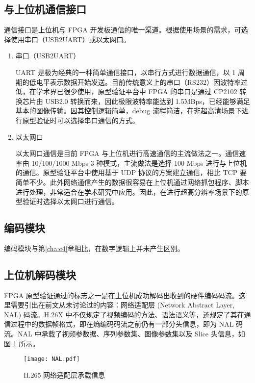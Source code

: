 \subsection{与上位机通信接口}
通信接口是上位机与 FPGA 开发板通信的唯一渠道。根据使用场景的需求，可选择使用串口（USB2UART）或以太网口。
\begin{enumerate}
    \item 串口（USB2UART）

        UART 是极为经典的一种简单通信接口，以串行方式进行数据通信，以 1 周期的低电平表示数据开始发送。目前传统意义上的串口（RS232）因波特率过低，在学术界已很少使用，原型验证平台中 FPGA 的串口是通过 CP2102 转换芯片由 USB2.0 转换而来，因此极限波特率能达到 1.5MBps，已经能够满足基本的图像传输。因其控制逻辑简单，debug 流程简洁，在非超高清场景下进行原型验证时可以选择串口通信的方式。

    \item 以太网口

        以太网口通信是目前 FPGA 与上位机进行高速通信的主流做法之一。通信速率由 10/100/1000 Mbps 3 种模式，主流做法是选择 100 Mbps 进行与上位机的通信。原型验证平台中使用基于 UDP 协议的方案建立通信，相比 TCP 要简单不少。此外网络通信产生的数据很容易在上位机通过网络抓包程序、脚本进行处理，非常适合在学术研究中应用。因此，在进行超高分辨率场景下的原型验证时选择以太网口进行通信。
\end{enumerate}

\subsection{编码模块}
编码模块与第\ref{cha:c4}章相比，在数字逻辑上并未产生区别。

\subsection{上位机解码模块}
FPGA 原型验证通过的标志之一是在上位机成功解码出收到的硬件编码码流。这里需要引出在前文从未讨论过的内容：网络适配层 (Network Abstract Layer, NAL) 码流。H.26X 中不仅规定了视频编码的方法、语法语义等，还规定了其在通信过程中的数据帧格式，即在熵编码码流之前仍有一部分头信息，即为 NAL 码流。NAL 中承载了视频参数据、序列参数集、图像参数集以及 Slice 头信息，如图 \ref{fig:NAL} 所示。
\begin{figure}[hbt]
    \centering
    \texttt{[image: NAL.pdf]}
    \caption{H.265 网络适配层承载信息}
    \label{fig:NAL}
\end{figure}


